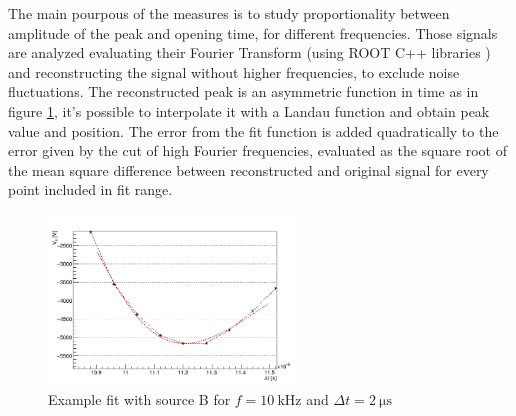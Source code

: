 The main pourpous of the measures is to study proportionality between amplitude of the peak and opening time, for different frequencies. Those signals are analyzed evaluating their Fourier Transform (using ROOT C++ libraries \cite{ROOT:fft}) and reconstructing the signal without higher frequencies, to exclude noise fluctuations. The reconstructed peak is an asymmetric function in time as in figure \ref{fig:landau}, it's possible to interpolate it with a Landau function \cite{ROOT:landau} and obtain peak value and position.
The error from the fit function is added quadratically to the error given by the cut of high Fourier frequencies, evaluated as the square root of the mean square difference between reconstructed and original signal for every point included in fit range.
\begin{figure}
\centering
 \includegraphics[width=0.6\textwidth]{Images/Electric/esfit_f10_t2.png}
 \caption{Example fit with source B for $f = \SI{10}{\kilo\hertz}$ and $\Delta t = \SI{2}{\micro\second}$}
 \label{fig:landau}
\end{figure}


